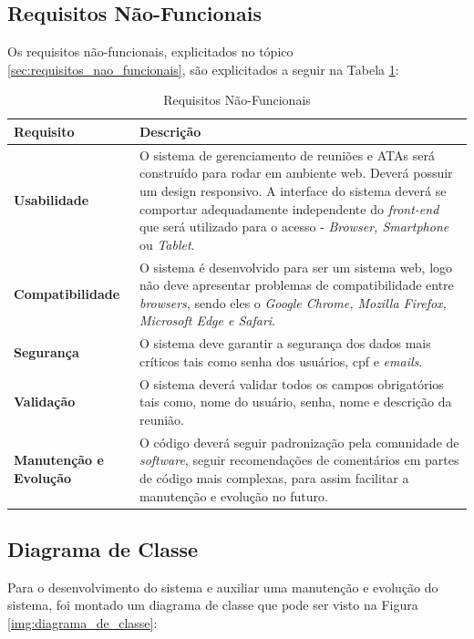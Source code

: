 \subsection{Requisitos Não-Funcionais}

Os requisitos não-funcionais, explicitados no tópico \ref{sec:requisitos_nao_funcionais}, são explicitados a seguir na Tabela \ref{tab:requisitos_nao_funcionais}:

\begin{table}[H]
	\begin{tabular}{|p{5.0cm}|p{10.0cm}|} 
	\hline
	\textbf{Requisito} & \textbf{Descrição} \\ \hline
	\textbf{Usabilidade} & O sistema de gerenciamento de reuniões e ATAs será construído para rodar em ambiente web. Deverá possuir um design responsivo. A interface do sistema deverá se comportar adequadamente independente do \textit{front-end} que será utilizado para o acesso - \textit{Browser, Smartphone} ou \textit{Tablet}. \\ \hline
	\textbf{Compatibilidade} & O sistema é desenvolvido para ser um sistema web, logo não deve apresentar problemas de compatibilidade entre \textit{browsers}, sendo eles o \textit{Google Chrome, Mozilla Firefox, Microsoft Edge e Safari}. \\ \hline
	\textbf{Segurança} & O sistema deve garantir a segurança dos dados mais críticos tais como senha dos usuários, cpf e \textit{emails}. \\ \hline
	\textbf{Validação} & O sistema deverá validar todos os campos obrigatórios tais como, nome do usuário, senha, nome e descrição da reunião. \\ \hline
	\textbf{Manutenção e Evolução} & O código deverá seguir padronização pela comunidade de \textit{software}, seguir recomendações de comentários em partes de código mais complexas, para assim facilitar a manutenção e evolução no futuro. \\ \hline
	\end{tabular}
	 \caption{Requisitos Não-Funcionais}
	 \label{tab:requisitos_nao_funcionais}
\end{table}

\subsection{Diagrama de Classe}

Para o desenvolvimento do sistema e auxiliar uma manutenção e evolução do sistema, foi montado um diagrama de classe que pode ser visto na Figura \ref{img:diagrama_de_classe}:

